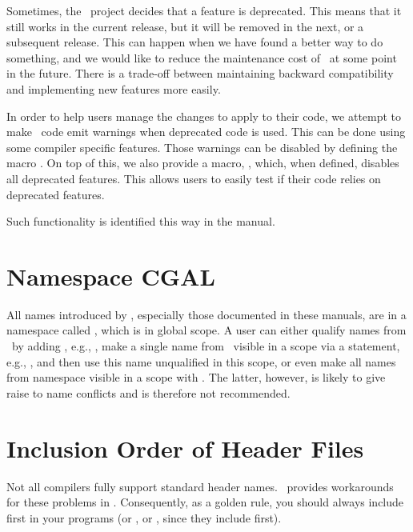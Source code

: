 Sometimes, the \cgal\ project decides that a feature is deprecated.  This means
that it still works in the current release, but it will be removed in the next,
or a subsequent release.  This can happen when we have found a better way to do
something, and we would like to reduce the maintenance cost of \cgal\ at some
point in the future.  There is a trade-off between maintaining backward
compatibility and implementing new features more easily.

In order to help users manage the changes to apply to their code, we attempt
to make \cgal\ code emit warnings when deprecated code is used.  This can be
done using some compiler specific features.  Those warnings can be disabled
by defining the macro .  On top of this, we
also provide a macro, , which, when defined,
disables all deprecated features.  This allows users to easily test if their
code relies on deprecated features.

\begin{ccDeprecated}
Such functionality is identified this way in the manual.
\end{ccDeprecated}


\section{Namespace CGAL}

All names introduced by \cgal, especially those documented in these
manuals, are in a namespace called , which is in global
scope. A user can either qualify names from \cgal\ by adding
, e.g., ,
make a single name from \cgal\ visible in a scope via a 
statement, e.g., , and then use this name
unqualified in this scope, or even make all names from namespace
 visible in a scope with . The
latter, however, is likely to give raise to name conflicts and is
therefore not recommended.


\section{Inclusion Order of Header Files}

Not all compilers fully support standard header names. \cgal\ provides 
workarounds for these problems in . Consequently, as a 
golden rule, you should always include  first in your 
programs (or , or , since they 
include  first).



